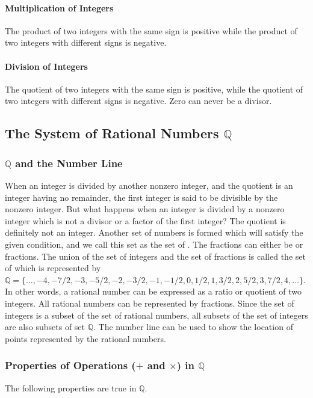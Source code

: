 \paragraph*{Multiplication of Integers}
The product of two integers with the same sign is positive while the product of two integers
with different signs is negative.

\paragraph*{Division of Integers}
The quotient of two integers with the same sign is positive, while the quotient of two
integers with different signs is negative. Zero can never be a divisor.
\subsection*{The System of Rational Numbers $\mathbb Q$}
\subsubsection*{$\mathbb Q$ and the Number Line}
When an integer is divided by another nonzero integer, and the quotient is an integer having no
remainder, the first integer is said to be divisible by the nonzero integer. But what happens when an
integer is divided by a nonzero integer which is not a divisor or a factor of the first integer? The
quotient is definitely not an integer. Another set of numbers is formed which will satisfy the given
condition, and we call this set as the set of . The fractions can either be  or 
fractions. The union of the set of integers and the set of fractions is called the set of  which is represented by $\mathbb Q = \{\ldots, -4, -7/2, -3, -5/2, -2, -3/2, -1, -1/2, 0, 1/2, 1, 3/2, 2, 5/2, 3,
7/2, 4, \ldots\}$. In other words, a rational number can be expressed as a ratio or quotient of two integers.
All rational numbers can be represented by fractions. Since the set of integers is a subset of the set
of rational numbers, all subsets of the set of integers are also subsets of set $\mathbb Q$. The number line can
be used to show the location of points represented by the rational numbers. %
\subsubsection*{Properties of Operations ($+$ and $\times$) in $\mathbb Q$}
The following properties are true in $\mathbb Q$.

